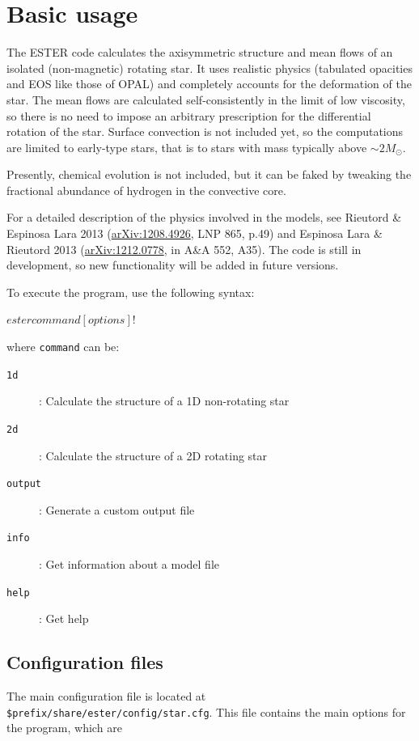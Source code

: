 \chapter{Basic usage}

The ESTER code calculates the axisymmetric structure and mean flows
of an isolated (non-magnetic) rotating star. It uses realistic physics
(tabulated opacities and EOS like those of OPAL) and completely
accounts for the deformation of the star.  The mean flows are calculated
self-consistently in the limit of low viscosity, so there is no need
to impose an arbitrary prescription for the differential rotation of
the star.  Surface convection is not included yet, so the computations
are limited to early-type stars, that is to stars with mass typically
above $\sim 2 M_\odot$.

Presently, chemical evolution is not included, but it can be faked
by tweaking the fractional abundance of hydrogen in the convective core.

For a detailed description of the physics involved in the models, 
see Rieutord \& Espinosa Lara 2013
(\href{http://arxiv.org/abs/1208.4926}{arXiv:1208.4926}, LNP 865, p.49) and
Espinosa Lara \& Rieutord 2013
(\href{http://arxiv.org/abs/1212.0778}{arXiv:1212.0778}, in A\&A 552, A35).
The code is still in development, so new functionality will be added in
future versions.

To execute the program, use the following syntax:
\begin{shell}
    $ ester command [options]
    !$
\end{shell}
where \texttt{command} can be:
\begin{description}
    \item[{\tt 1d}]: Calculate the structure of a 1D non-rotating star
    \item[{\tt 2d}]: Calculate the structure of a 2D rotating star
    \item[{\tt output}]: Generate a custom output file
    \item[{\tt info}]: Get information about a model file
    \item[{\tt help}]: Get help
\end{description}

\section{Configuration files}

The main configuration file is located at
\texttt{\$prefix/share/ester/config/star.cfg}.
This file contains the main options for the program, which are

